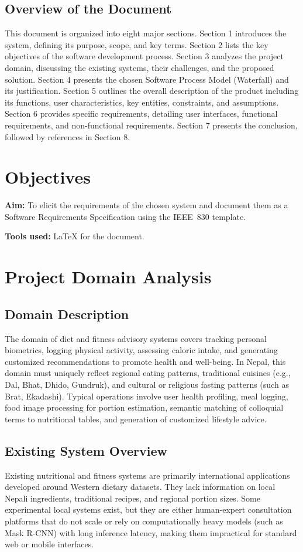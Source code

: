 \documentclass[11pt,a4paper]{article}
\begin{document}
\subsection{Overview of the Document}
This document is organized into eight major sections. Section 1 introduces the system, defining its purpose, scope, and key terms. Section 2 lists the key objectives of the software development process. Section 3 analyzes the project domain, discussing the existing systems, their challenges, and the proposed solution. Section 4 presents the chosen Software Process Model (Waterfall) and its justification. Section 5 outlines the overall description of the product including its functions, user characteristics, key entities, constraints, and assumptions. Section 6 provides specific requirements, detailing user interfaces, functional requirements, and non-functional requirements. Section 7 presents the conclusion, followed by references in Section 8.

\section{Objectives}
\textbf{Aim:} To elicit the requirements of the chosen system and document them as a Software Requirements Specification using the IEEE~830 template.

\textbf{Tools used:} \LaTeX{} for the document.


\section{Project Domain Analysis}

\subsection{Domain Description}
The domain of diet and fitness advisory systems covers tracking personal biometrics, logging physical activity, assessing caloric intake, and generating customized recommendations to promote health and well-being. In Nepal, this domain must uniquely reflect regional eating patterns, traditional cuisines (e.g., Dal, Bhat, Dhido, Gundruk), and cultural or religious fasting patterns (such as Brat, Ekadashi). Typical operations involve user health profiling, meal logging, food image processing for portion estimation, semantic matching of colloquial terms to nutritional tables, and generation of customized lifestyle advice.

\subsection{Existing System Overview}
Existing nutritional and fitness systems are primarily international applications developed around Western dietary datasets. They lack information on local Nepali ingredients, traditional recipes, and regional portion sizes. Some experimental local systems exist, but they are either human-expert consultation platforms that do not scale or rely on computationally heavy models (such as Mask R-CNN) with long inference latency, making them impractical for standard web or mobile interfaces.
\end{document}
